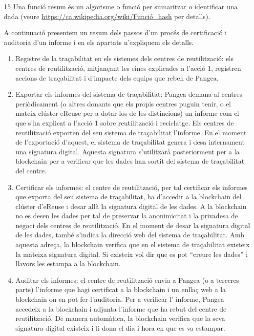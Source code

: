 \documentclass[
]{book}
\begin{document}
15 Una funció resum és un algorisme o funció per sumaritzar o identificar una dada (veure \url{https://ca.wikipedia.org/wiki/Funció_hash} per detalls).

A continuació presentem un resum dels passos d'un procés de certificació i auditoria d'un informe i en els apartats n'expliquem els detalls.

\begin{enumerate}
\def\labelenumi{\arabic{enumi}.}
\item
  Registre de la traçabilitat en els sistemes dels centres de reutilització: els centres de reutilització, mitjançant les eines explicades a l'acció 1, registren accions de traçabilitat i d'impacte dels equips que reben de Pangea.
\item
  Exportar els informes del sistema de traçabilitat: Pangea demana al centres periòdicament (o altres donants que els propis centres puguin tenir, o el mateix clúster eReuse per a dotar-los de les distincions) un informe com el que s'ha explicat a l'acció 1 sobre reutilització i reciclatge. Els centres de reutilització exporten del seu sistema de traçabilitat l'informe. En el moment de l'exportació d'aquest, el sistema de traçabilitat genera i desa internament una signatura digital. Aquesta signatura s'utilitzarà posteriorment per a la blockchain per a verificar que les dades han sortit del sistema de traçabilitat del centre.
\item
  Certificar els informes: el centre de reutilització, per tal certificar els informes que exporta del seu sistema de traçabilitat, ha d'accedir a la blockchain del clúster d'eReuse i desar allà la signatura digital de les dades. A la blockchain no es desen les dades per tal de preservar la anonimicitat i la privadesa de negoci dels centres de reutilització. En el moment de desar la signatura digital de les dades, també s'indica la direcció web del sistema de traçabilitat. Amb aquesta adreça, la blockchain verifica que en el sistema de traçabilitat existeix la mateixa signatura digital. Si existeix vol dir que es pot ``creure les dades'' i llavors les estampa a la blockchain.
\item
  Auditar els informes: el centre de reutilització envia a Pangea (o a terceres parts) l'informe que hagi certificat a la blockchain i un enllaç web a la blockchain on en pot fer l'auditoria. Per a verificar l' informe, Pangea accedeix a la blockchain i adjunta l'informe que ha rebut del centre de reutilització. De manera automàtica, la blockchain verifica que la seva signatura digital existeix i li dona el dia i hora en que es va estampar.
\end{enumerate}
\end{document}
